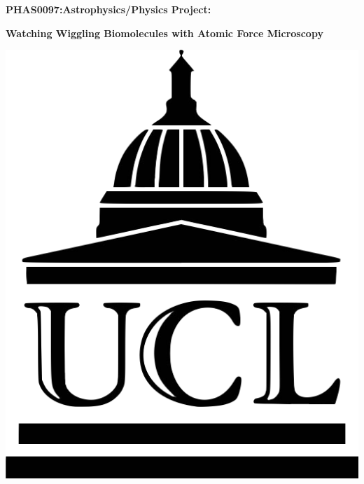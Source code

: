 \begin{titlepage}
\begin{center}
    

\vspace*{3cm}

\Huge{\textbf{PHAS0097:Astrophysics/Physics Project:}}

\LARGE{\textbf{Watching Wiggling Biomolecules with Atomic Force Microscopy}}
            
\vspace{1cm}

\includegraphics[scale=0.15]{Misc/University-college-london-logo.png}


\end{center}
\end{titlepage}
